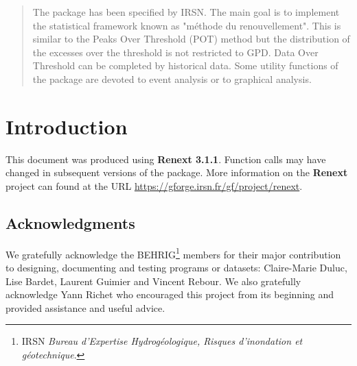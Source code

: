 \documentclass[a4paper]{report}
\newcommand\blankpage{%
    \null
    \thispagestyle{empty}%
    \addtocounter{page}{-1}%
    \newpage}
\newenvironment{Prov}
   {\medskip \par \noindent%
    \sf \color{blue} }%
  {\medskip \par}
\begin{document}
\begin{abstract}
  
  The \verb@Renext@ package has been specified by IRSN.  The main goal
  is to implement the statistical framework known as "m\'ethode du
  renouvellement".  This is similar to the Peaks Over Threshold (POT)
  method but the distribution of the excesses over the threshold is
  not restricted to GPD. Data Over Threshold can be completed by
  historical data.  Some utility functions of the package are devoted
  to event analysis or to graphical analysis.

\end{abstract}

\pagebreak

\setcounter{page}{1}

\chapter{Introduction}
\label{Chap-Intro}

\begin{Prov}
  This document was produced using  \textbf{Renext 3.1.1}. 
  Function calls may have changed in subsequent versions of the package.
  More information on the \textbf{Renext} project can found at the 
  URL \url{https://gforge.irsn.fr/gf/project/renext}.
\end{Prov}

\section*{Acknowledgments}
 
We gratefully acknowledge the BEHRIG\footnote{IRSN \textit{Bureau
    d'Expertise Hydrog\'eologique, Risques d'inondation et
    g\'eotechnique}.} members for their major contribution to
designing, documenting and testing programs or datasets: Claire-Marie
Duluc, Lise Bardet, Laurent Guimier and Vincent Rebour. We also
gratefully acknowledge Yann Richet who encouraged this project from
its beginning and provided assistance and useful advice.
\end{document}
